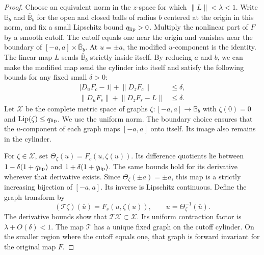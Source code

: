 \documentclass[11pt]{article}
\newcommand{\norm}[1]{\lVert #1\rVert}
\begin{document}
\begin{proof}
Choose an equivalent norm in the $z$-space for which
$\norm{L}<\lambda<1$.  Write $\mathbb B_b$ and
$\overline{\mathbb B}_b$ for the open and closed balls of radius $b$ centered
at the origin in this norm, and fix a small Lipschitz bound
$q_{\rm lip}>0$.
Multiply the nonlinear part of $F$ by a smooth cutoff.  The cutoff equals one
near the origin and vanishes near the boundary of
$[-a,a]\times\overline{\mathbb B}_b$.  At $u=\pm a$, the modified
$u$-component is the identity.  The linear map $L$ sends
$\overline{\mathbb B}_b$ strictly inside itself.  By
reducing $a$ and $b$, we can make the modified map send the cylinder into
itself and satisfy the following bounds for any fixed small $\delta>0$:
\begin{align*}
|D_uF_c-1|+\norm{D_zF_c}&\le\delta,\\
\norm{D_uF_s}+\norm{D_zF_s-L}&\le\delta.
\end{align*}
Let $\mathcal X$ be the complete metric space of graphs
$\zeta:[-a,a]\to\overline{\mathbb B}_b$ with $\zeta(0)=0$ and
$\operatorname{Lip}(\zeta)\le q_{\rm lip}$.  We use the uniform norm.  The
boundary choice ensures that the $u$-component of each graph maps $[-a,a]$
onto itself.  Its image also remains in the cylinder.

For $\zeta\in\mathcal X$, set
$\Theta_\zeta(u)=F_c(u,\zeta(u))$.  Its difference quotients lie between
$1-\delta(1+q_{\rm lip})$ and $1+\delta(1+q_{\rm lip})$.  The same bounds hold
for its derivative wherever that derivative exists.  Since
$\Theta_\zeta(\pm a)=\pm a$, this map is a strictly increasing bijection of
$[-a,a]$.  Its inverse is Lipschitz continuous.
Define the graph transform by
\[
(\mathcal T\zeta)(\bar u)
=F_s(u,\zeta(u)),
\qquad u=\Theta_\zeta^{-1}(\bar u).
\]
The derivative bounds show that $\mathcal T\mathcal X\subset\mathcal X$.  Its
uniform contraction factor is $\lambda+O(\delta)<1$.  The map $\mathcal T$
has a unique fixed graph on the cutoff cylinder.  On the smaller
region where the cutoff equals one, that graph is forward invariant for the
original map $F$.


\end{proof}
\end{document}
